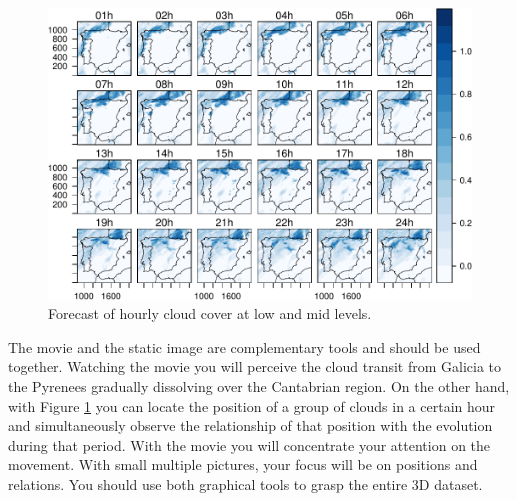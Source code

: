 \begin{figure}[htb]
\centering
\includegraphics[width=.9\linewidth]{figs/cft.pdf}
\caption{\label{fig:cft}Forecast of hourly cloud cover at low and mid levels.}
\end{figure}

The movie and the static image are complementary tools and should be
used together. Watching the movie you will perceive the cloud transit
from Galicia to the Pyrenees gradually dissolving over the Cantabrian
region. On the other hand, with Figure \ref{fig:cft} you can locate the
position of a group of clouds in a certain hour and simultaneously
observe the relationship of that position with the evolution during
that period. With the movie you will concentrate your attention on the
movement. With small multiple pictures, your focus will be on
positions and relations. You should use both graphical tools to grasp
the entire 3D dataset.
